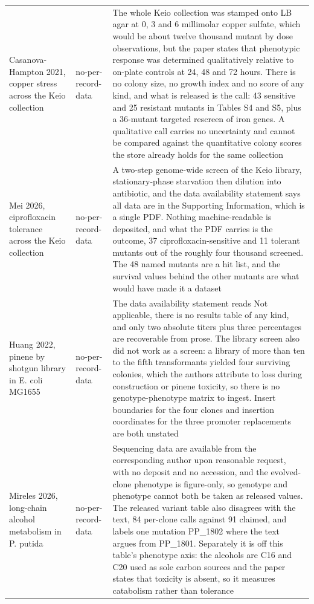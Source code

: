 \begin{longtable}{@{}L{58mm} L{28mm} L{83mm}@{}}
\addlinespace[5pt]
Casanova-Hampton 2021, copper stress across the Keio collection & no-per-record-data & The whole Keio collection was stamped onto LB agar at 0, 3 and 6 millimolar copper sulfate, which would be about twelve thousand mutant by dose observations, but the paper states that phenotypic response was determined qualitatively relative to on-plate controls at 24, 48 and 72 hours. There is no colony size, no growth index and no score of any kind, and what is released is the call: 43 sensitive and 25 resistant mutants in Tables S4 and S5, plus a 36-mutant targeted rescreen of iron genes. A qualitative call carries no uncertainty and cannot be compared against the quantitative colony scores the store already holds for the same collection \\
\addlinespace[5pt]
Mei 2026, ciprofloxacin tolerance across the Keio collection & no-per-record-data & A two-step genome-wide screen of the Keio library, stationary-phase starvation then dilution into antibiotic, and the data availability statement says all data are in the Supporting Information, which is a single PDF. Nothing machine-readable is deposited, and what the PDF carries is the outcome, 37 ciprofloxacin-sensitive and 11 tolerant mutants out of the roughly four thousand screened. The 48 named mutants are a hit list, and the survival values behind the other mutants are what would have made it a dataset \\
\addlinespace[5pt]
Huang 2022, pinene by shotgun library in E. coli MG1655 & no-per-record-data & The data availability statement reads Not applicable, there is no results table of any kind, and only two absolute titers plus three percentages are recoverable from prose. The library screen also did not work as a screen: a library of more than ten to the fifth transformants yielded four surviving colonies, which the authors attribute to loss during construction or pinene toxicity, so there is no genotype-phenotype matrix to ingest. Insert boundaries for the four clones and insertion coordinates for the three promoter replacements are both unstated \\
\addlinespace[5pt]
Mireles 2026, long-chain alcohol metabolism in P. putida & no-per-record-data & Sequencing data are available from the corresponding author upon reasonable request, with no deposit and no accession, and the evolved-clone phenotype is figure-only, so genotype and phenotype cannot both be taken as released values. The released variant table also disagrees with the text, 84 per-clone calls against 91 claimed, and labels one mutation PP\_1802 where the text argues from PP\_1801. Separately it is off this table's phenotype axis: the alcohols are C16 and C20 used as sole carbon sources and the paper states that toxicity is absent, so it measures catabolism rather than tolerance \\

\end{longtable}
